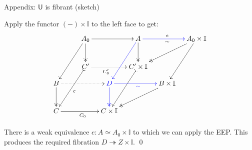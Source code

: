 \documentclass[handout]{beamer}
\renewcommand{\epi}{\twoheadrightarrow}
\newcommand{\U}{\mathsf{U}}
\newcommand{\II}{\mathbb{I}}
\theoremstyle{remark}
\begin{document}
\begin{frame}{Appendix: $\U$ is fibrant (sketch)}

Apply the functor $(-)\times\II$ to the left face to get:
\begin{equation*}
\begin{gathered}
\xymatrix@=1em{
&& \ar[llddd] A_0 \ar@{->>}[dd] \ar[rr]  &&  \ar@[blue][lddd] A \ar@{->>}[dd] \ar@[blue][rr]^e_{\sim} &&  \ar@{->>}[lldd] A_0\times\II \ar[lddd]  \\
&& && &&\\
&& \ar@{>->}[llddd]^c C' \ar[rr]_<<<<<<<<{C'_0}  &&  \ar@{>->}[lddd] C'\times\II && \\
B \ar@{->>}[dd] \ar@{..>}[rrr] &&& {\color{blue}D} \ar@[blue]@{->>}[dd] \ar@[blue][rr]_{\color{blue}\sim} && \ar@{->>}[lldd] B\times\II &\\
&&&& &&\\
C\ar[rrr]_{C_0} &&& C\times\II &&&
}
\end{gathered}
\end{equation*}

There is a weak equivalence $e:A \simeq A_0\times \II$ to which we can apply the EEP.
This produces the required fibration $D\epi Z\times \II$. 
\qed

\end{frame}
\end{document}
